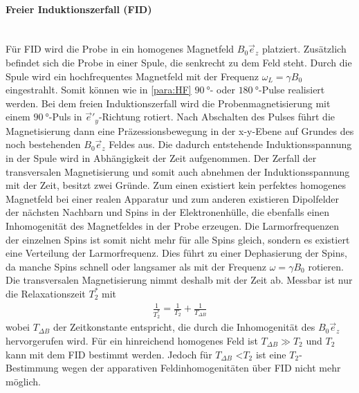 \paragraph{Freier Induktionszerfall (FID)}\\
Für FID wird die Probe
in ein homogenes Magnetfeld $B_0\vec{e}_z$ platziert.
Zusätzlich befindet sich die Probe in einer
Spule, die senkrecht zu dem Feld steht.
Durch die Spule wird ein hochfrequentes Magnetfeld
mit der Frequenz $\omega_L=\gamma B_0$ eingestrahlt.
Somit können wie in \ref{para:HF} $\SI{90}{\degree}$- oder $\SI{180}{\degree}$-Pulse
realisiert werden.
Bei dem freien Induktionszerfall wird die Probenmagnetisierung mit einem
$\SI{90}{\degree}$-Puls in $\vec{e}'_y$-Richtung rotiert. Nach
Abschalten des Pulses
führt die Magnetisierung dann eine Präzessionsbewegung in der
x-y-Ebene auf Grundes des noch bestehenden $B_0\vec{e}_z$ Feldes aus.
Die dadurch entstehende Induktionsspannung in der Spule wird in Abhängigkeit der Zeit aufgenommen.
Der Zerfall der transversalen Magnetisierung und somit auch abnehmen der
Induktionsspannung mit der Zeit, besitzt zwei Gründe.
Zum einen existiert kein perfektes homogenes Magnetfeld bei einer
realen Apparatur und zum anderen
existieren Dipolfelder der nächsten Nachbarn und Spins in der Elektronenhülle,
die ebenfalls einen Inhomogenität des Magnetfeldes in der Probe erzeugen.
Die Larmorfrequenzen der einzelnen Spins ist somit nicht mehr für alle Spins
gleich, sondern es existiert eine Verteilung der Larmorfrequenz.
Dies führt zu einer Dephasierung
der Spins, da manche Spins schnell oder langsamer
als mit der Frequenz $\omega=\gamma B_0$ rotieren.
Die transversalen Magnetisierung nimmt deshalb mit der Zeit ab.
Messbar ist nur die Relaxationszeit $T_2^*$
mit
\begin{align}
  \frac{1}{T_2^*} = \frac{1}{T_2} + \frac{1}{T_{\Delta B}}
\end{align}
wobei $T_{\Delta B}$ der Zeitkonstante entspricht, die durch die Inhomogenität
des $B_0\vec{e}_z$ hervorgerufen wird.
Für ein hinreichend homogenes Feld ist $T_{\Delta B} \gg T_2$
und $T_2$ kann mit dem FID bestimmt werden.
Jedoch für $T_{\Delta B}$ \textless $T_2$ ist eine $T_2$-Bestimmung wegen
der apparativen Feldinhomogenitäten über FID nicht mehr möglich.

